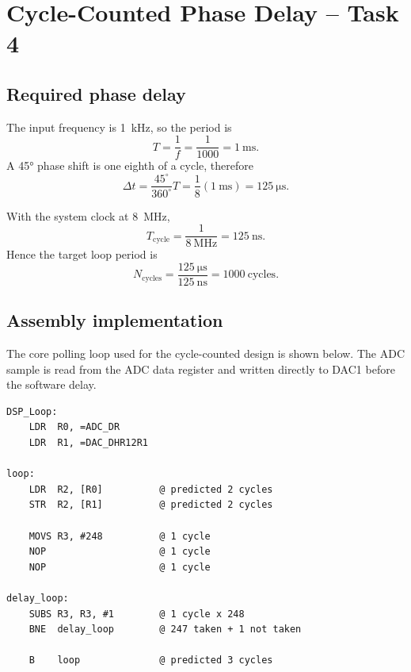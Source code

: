 \documentclass[11pt,a4paper]{article}
\begin{document}
\section{Cycle-Counted Phase Delay -- Task 4}

\subsection{Required phase delay}
The input frequency is \SI{1}{\kilo\hertz}, so the period is
\begin{equation}
T=\frac{1}{f}=\frac{1}{1000}=\SI{1}{\milli\second}.
\end{equation}
A \ang{45} phase shift is one eighth of a cycle, therefore
\begin{equation}
\Delta t=\frac{45^\circ}{360^\circ}T
       =\frac{1}{8}(\SI{1}{\milli\second})
       =\boxed{\SI{125}{\micro\second}}.
\end{equation}

With the system clock at \SI{8}{\mega\hertz},
\begin{equation}
T_{\mathrm{cycle}}=\frac{1}{\SI{8}{\mega\hertz}}
=\boxed{\SI{125}{\nano\second}}.
\end{equation}
Hence the target loop period is
\begin{equation}
N_{\mathrm{cycles}}=\frac{\SI{125}{\micro\second}}{\SI{125}{\nano\second}}
=\boxed{1000\ \text{cycles}}.
\end{equation}

\subsection{Assembly implementation}
The core polling loop used for the cycle-counted design is shown below. The ADC sample is read from the ADC data register and written directly to DAC1 before the software delay.

\begin{lstlisting}[caption={Core Task 4 ADC-to-DAC loop.}]
DSP_Loop:
    LDR  R0, =ADC_DR
    LDR  R1, =DAC_DHR12R1

loop:
    LDR  R2, [R0]          @ predicted 2 cycles
    STR  R2, [R1]          @ predicted 2 cycles

    MOVS R3, #248          @ 1 cycle
    NOP                    @ 1 cycle
    NOP                    @ 1 cycle

delay_loop:
    SUBS R3, R3, #1        @ 1 cycle x 248
    BNE  delay_loop        @ 247 taken + 1 not taken

    B    loop              @ predicted 3 cycles
\end{lstlisting}
\end{document}
